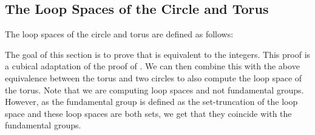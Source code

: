 \subsection{The Loop Spaces of the Circle and Torus}

The loop spaces of the circle and torus are defined as follows:
%

The goal of this section is to prove that  is equivalent to
the integers. This proof is a cubical adaptation of the proof of
. We can then combine this with the above equivalence
between the torus and two circles to also compute the loop space of
the torus. Note that we are computing loop spaces and not fundamental
groups. 
% 
% 
However, as the fundamental group is defined as the
set-truncation of the loop space and these loop spaces are both sets,
we get that they coincide with the fundamental groups.

